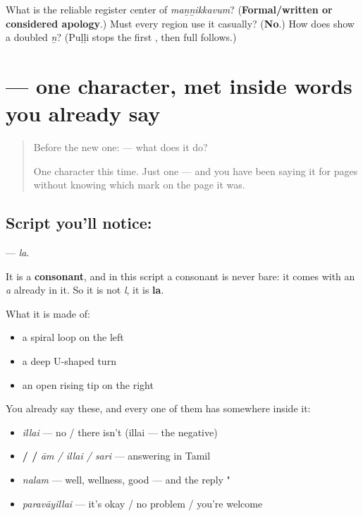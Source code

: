 \begin{tcolorbox}[breakable,colback=teal!4,colframe=teal!35!black,title={Before you move on}]
What is the reliable register center of \emph{maṉṉikkavum}? (\textbf{Formal/written or considered apology}.) Must every region use it casually? (\textbf{No}.) How does \textbf{} show a doubled \emph{ṉ}? (Puḷḷi stops the first \textbf{}, then full \textbf{} follows.)
\end{tcolorbox}
\section[\texorpdfstring{\ta{ல} (la)}{ல (la)}]{ — one character, met inside words you already say}

\label{lesson:TA-S113-letter-la}



\begin{quote}
Before the new one:  — what does it do?

One character this time. Just one — and you have been saying it for pages without knowing which mark on the page it was.
\end{quote}

\subsection*{Script you'll notice: }
\textbf{} — \emph{la}.

It is a \textbf{consonant}, and in this script a consonant is never bare: it comes with an \emph{a} already in it. So it is not \emph{l}, it is \textbf{la}.

What it is made of:

\begin{itemize}
\raggedright
  \item a spiral loop on the left
  \item a deep U-shaped turn
  \item an open rising tip on the right
\end{itemize}

You already say these, and every one of them has  somewhere inside it:

\begin{itemize}
\raggedright
  \item \textbf{} \emph{illai} — no / there isn't (illai — the negative)
  \item \textbf{ /  / } \emph{ām / illai / sari} — answering in Tamil
  \item \textbf{} \emph{nalam} — well, wellness, good — and the reply "  
  \item \textbf{} \emph{paravāyillai} — it's okay / no problem / you're welcome
\end{itemize}

